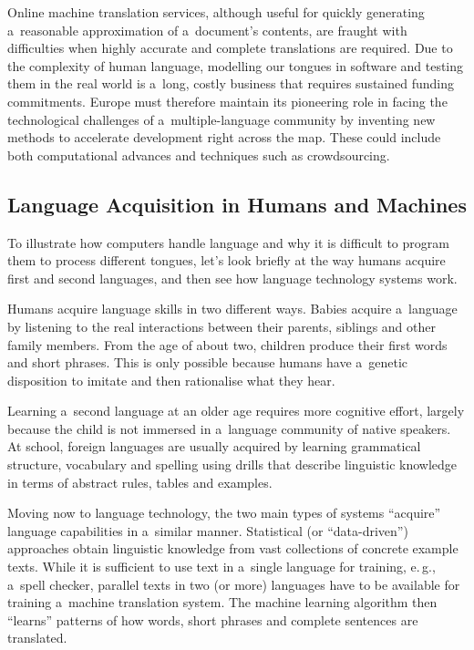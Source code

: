 \begin{multicols}{2}

Online machine translation services, although useful for quickly
generating a~reasonable approximation of a~document’s contents, are
fraught with difficulties when highly accurate and complete
translations are required. Due to the complexity of human language,
modelling our tongues in software and testing them in the real world
is a~long, costly business that requires sustained funding
commitments. Europe must therefore maintain its pioneering role in
facing the technological challenges of a~multiple-language community
by inventing new methods to accelerate development right across the
map. These could include both computational advances and techniques
such as crowdsourcing. 

\subsection{Language Acquisition in Humans and Machines} 

To illustrate how computers handle language and why it is difficult to
program them to process different tongues, let’s look briefly at the
way humans acquire first and second languages, and then see how
language technology systems work. 

Humans acquire language skills in two different ways. Babies acquire
a~language by listening to the real interactions between their
parents, siblings and other family members. From the age of about two,
children produce their first words and short phrases. This is only
possible because humans have a~genetic disposition to imitate and then
rationalise what they hear. 

Learning a~second language at an older age requires more cognitive
effort, largely because the child is not immersed in a~language
community of native speakers. At school, foreign languages are usually
acquired by learning grammatical structure, vocabulary and spelling
using drills that describe linguistic knowledge in terms of abstract
rules, tables and examples. 


Moving now to language technology, the two main types of systems
“acquire” language capabilities in a~similar manner. Statistical
(or “data-driven”) approaches obtain linguistic knowledge from
vast collections of concrete example texts. While it is sufficient to
use text in a~single language for training, e.\,g., a~spell checker,
parallel texts in two (or more) languages have to be available for
training a~machine translation system. The machine learning algorithm
then “learns” patterns of how words, short phrases and complete
sentences are translated. 


\end{multicols}
